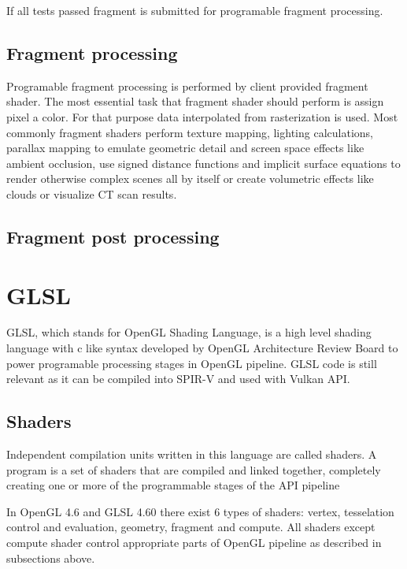If all tests passed fragment is submitted for programable fragment processing.

\subsection{Fragment processing}

Programable fragment processing is performed by client provided fragment shader. The most essential task that fragment shader should perform is assign pixel a color.
For that purpose data interpolated from rasterization is used. 
Most commonly fragment shaders perform texture mapping, lighting calculations, parallax mapping to emulate geometric detail and screen space effects like ambient occlusion, 
use signed distance functions and implicit surface equations to render otherwise complex scenes all by itself or create volumetric effects like clouds or visualize CT scan results.

\subsection{Fragment post processing}


\section{GLSL}

GLSL, which stands for OpenGL Shading Language, is a high level shading language with c like syntax developed by OpenGL Architecture Review Board to power programable processing stages in OpenGL pipeline. 
GLSL code is still relevant as it can be compiled into SPIR-V and used with Vulkan API.

\subsection*{Shaders}

Independent compilation units written in this language are called shaders. A program is a set of
shaders that are compiled and linked together, completely creating one or more of the
programmable stages of the API pipeline %

In OpenGL 4.6 and GLSL 4.60 there exist 6 types of shaders: vertex, tesselation control and evaluation, geometry, fragment and compute.
All shaders except compute shader control appropriate parts of OpenGL pipeline as described in subsections above. 


